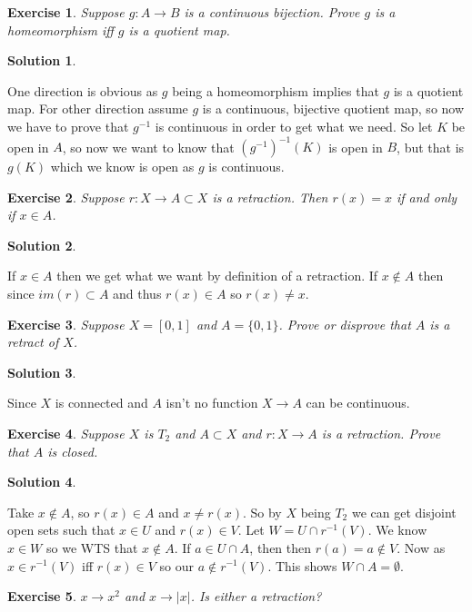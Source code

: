 \documentclass[11pt,a4paper]{article}
\newtheorem{Ex}{Exercise}
\newtheorem{Sol}{Solution}
\newcommand{\ra}{\rightarrow}
\begin{document}
\begin{Ex}
	Suppose $g: A \ra B$ is a continuous bijection. Prove $g$ is a homeomorphism iff $g$ is a quotient map.
 \end{Ex} 
\begin{Sol}
\end{Sol}
\noindent One direction is obvious as $g$ being a homeomorphism implies that $g$ is a quotient map. For other direction assume $g$ is a continuous, bijective quotient map, so now we have to prove that $g^{-1}$ is continuous in order to get what we need. So let $K$ be open in $A$, so now we want to know that $(g^{-1})^{-1}(K)$ is open in $B$, but that is $g(K)$ which we know is open as $g$ is continuous.

\begin{Ex}
	Suppose $r: X \ra A \subset X$ is a retraction. Then $r(x) = x$ if and only if $x \in A$.
\end{Ex}

\begin{Sol}
\end{Sol}
\noindent If $x\in A$ then we get what we want by definition of a retraction. If $x\not \in A$ then since $im(r) \subset A$ and thus $r(x) \in A$ so $r(x) \neq x$. 

\begin{Ex}
	Suppose $X = [0,1]$ and $A = \{0,1\}$. Prove or disprove that $A$ is a retract of $X$.
\end{Ex}
\begin{Sol}\end{Sol}
\noindent Since $X$ is connected and $A$ isn't no function $X \ra A$ can be continuous.

\begin{Ex}
	Suppose $X$ is $T_2$ and $A \subset X$ and $r:X \ra A$ is a retraction. Prove that $A$ is closed.
\end{Ex}

\begin{Sol}\end{Sol}

\noindent Take $x \not \in A$, so $r(x) \in A$ and $x \neq r(x)$. So by $X$ being $T_2$ we can get disjoint open sets such that $x\in U$ and $r(x) \in V$. Let $W = U \cap r^{-1}(V)$. We know $x\in W$ so we WTS that $x \not \in A$. If $a \in U \cap A$, then then $r(a) = a \not \in V$. Now as $x \in r^{-1}(V)$ iff $r(x) \in V$ so our $a \not\in r^{-1}(V)$. This shows $W \cap A = \emptyset$.

\begin{Ex}
	$x \ra x^2$ and $x \ra |x|$. Is either a retraction? 
\end{Ex} 
\end{document}
